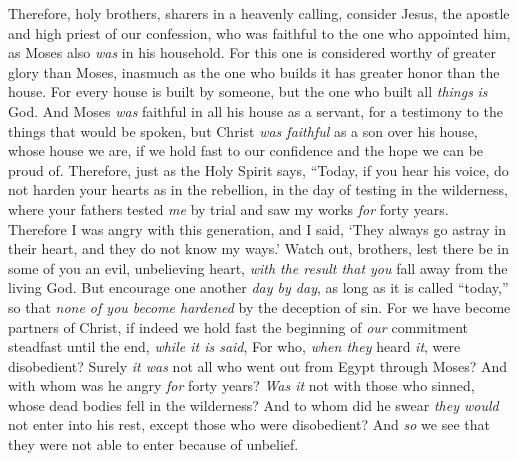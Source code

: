 \begin{biblechapter} %
 Therefore, holy brothers, sharers in a heavenly calling, consider Jesus, the apostle and high priest of our confession,
\verse who was faithful to the one who appointed him, as Moses also \textit{was} in his household.
\verse For this one is considered worthy of greater glory than Moses, inasmuch as the one who builds it has greater honor than the house.
\verse For every house is built by someone, but the one who built all \textit{things} \textit{is} God.
\verse And Moses \textit{was} faithful in all his house as a servant, for a testimony to the things that would be spoken,
\verse but Christ \textit{was faithful} as a son over his house, whose house we are, if we hold fast to our confidence and the hope we can be proud of.
 Therefore, just as the Holy Spirit says,
\verse “Today, if you hear his voice,
\verse do not harden your hearts as in the rebellion, 
in the day of testing in the wilderness,
\verse where your fathers tested \textit{me} by trial 
and saw my works
\verse \textit{for} forty years. 
Therefore I was angry with this generation, 
and I said, ‘They always go astray in their heart, 
and they do not know my ways.’
\verse Watch out, brothers, lest there be in some of you an evil, unbelieving heart, \textit{with the result that you} fall away from the living God.
\verse But encourage one another \textit{day by day}, as long as it is called “today,” so that \textit{none of you become hardened} by the deception of sin.
\verse For we have become partners of Christ, if indeed we hold fast the beginning of \textit{our} commitment steadfast until the end,
\verse \textit{while it is said},
\verse For who, \textit{when they} heard \textit{it}, were disobedient? Surely \textit{it was} not all who went out from Egypt through Moses?
\verse And with whom was he angry \textit{for} forty years? \textit{Was it} not with those who sinned, whose dead bodies fell in the wilderness?
\verse And to whom did he swear \textit{they would} not enter into his rest, except those who were disobedient?
\verse And \textit{so} we see that they were not able to enter because of unbelief.
\end{biblechapter}

